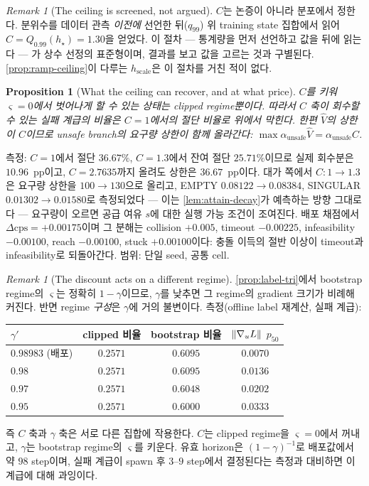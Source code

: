 \documentclass[11pt]{article}
\theoremstyle{plain}
\newtheorem{proposition}[theorem]{Proposition}
\theoremstyle{definition}
\theoremstyle{remark}
\newtheorem{remark}[theorem]{Remark}
\DeclarePairedDelimiter{\norm}{\lVert}{\rVert}
\newcommand{\Vhat}{\widehat V}
\newcommand{\grad}{\nabla}
\begin{document}
\begin{remark}[The ceiling is screened, not argued]\label{rem:C-select}
$C$는 논증이 아니라 분포에서 정한다. 분위수를 데이터 관측 \emph{이전에} 선언한 뒤($q_{99}$)
위 training state 집합에서 읽어 $C=Q_{0.99}(h_\star)=1.30$을 얻었다. 이 절차 --- 통계량을 먼저
선언하고 값을 뒤에 읽는다 --- 가 상수 선정의 표준형이며, 결과를 보고 값을 고르는 것과 구별된다.
\cref{prop:ramp-ceiling}이 다루는 $h_{\mathrm{scale}}$은 이 절차를 거친 적이 없다.
\end{remark}

\begin{proposition}[What the ceiling can recover, and at what price]\label{prop:C-ceiling}
$C$를 키워 $\varsigma=0$에서 벗어나게 할 수 있는 상태는 clipped regime뿐이다. 따라서 $C$ 축이
회수할 수 있는 실패 계급의 비율은 $C=1$에서의 절단 비율로 위에서 막힌다. 한편 $\Vhat$의 상한이
$C$이므로 unsafe branch의 요구량 상한이 함께 올라간다:
$\max\alpha_{\mathrm{unsafe}}\Vhat=\alpha_{\mathrm{unsafe}}C$.
\end{proposition}

\noindent
측정: $C=1$에서 절단 $36.67\%$, $C=1.3$에서 잔여 절단 $25.71\%$이므로 실제 회수분은 $10.96$~pp이고,
$C=2.7635$까지 올려도 상한은 $36.67$~pp이다. 대가 쪽에서 $C:1\to1.3$은 요구량 상한을 $100\to130$으로
올리고, EMPTY $0.08122\to0.08384$, SINGULAR $0.01302\to0.01580$로 측정되었다 --- 이는
\cref{lem:attain-decay}가 예측하는 방향 그대로다 --- 요구량이 오르면 공급 여유 $s$에 대한 실행 가능 조건이 조여진다. 배포 채점에서 $\Delta\mathrm{cps}=+0.00175$이며
그 분해는 collision $+0.005$, timeout $-0.00225$, infeasibility $-0.00100$, reach $-0.00100$,
stuck $+0.00100$이다: 충돌 이득의 절반 이상이 timeout과 infeasibility로 되돌아간다. 범위: 단일
seed, 공통 cell.

\begin{remark}[The discount acts on a different regime]\label{rem:gamma-act}
\cref{prop:label-tri}에서 bootstrap regime의 $\varsigma$는 정확히 $1-\gamma$이므로, $\gamma$를
낮추면 그 regime의 gradient 크기가 비례해 커진다. 반면 regime \emph{구성}은 $\gamma$에 거의
불변이다. 측정(offline label 재계산, 실패 계급):
\begin{center}
\begin{tabular}{lccc}
\toprule
$\gamma'$ & clipped 비율 & bootstrap 비율 & $\norm{\grad_u L}$ $p_{50}$ \\
\midrule
$0.98983$ (배포) & $0.2571$ & $0.6095$ & $0.0070$ \\
$0.98$           & $0.2571$ & $0.6095$ & $0.0136$ \\
$0.97$           & $0.2571$ & $0.6048$ & $0.0202$ \\
$0.95$           & $0.2571$ & $0.6000$ & $0.0333$ \\
\bottomrule
\end{tabular}
\end{center}
즉 $C$ 축과 $\gamma$ 축은 서로 다른 집합에 작용한다. $C$는 clipped regime을 $\varsigma=0$에서
꺼내고, $\gamma$는 bootstrap regime의 $\varsigma$를 키운다. 유효 horizon은 $(1-\gamma)^{-1}$로
배포값에서 약 $98$ step이며, 실패 계급이 spawn 후 $3$--$9$ step에서 결정된다는 측정과 대비하면
이 계급에 대해 과잉이다.
\end{remark}
\end{document}
